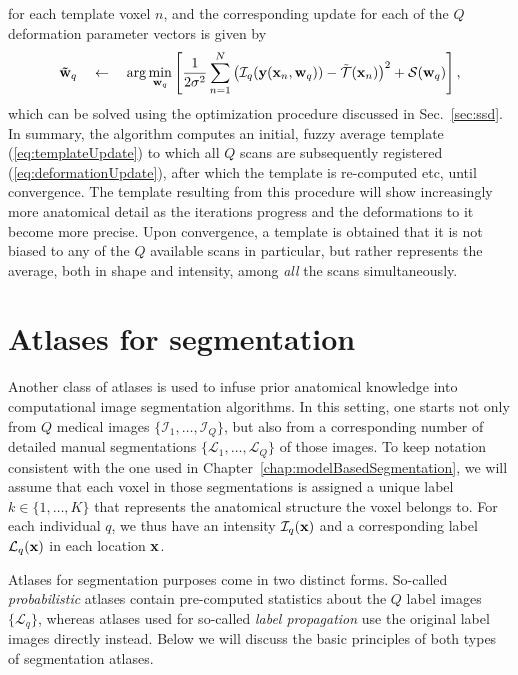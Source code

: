 \documentclass[10pt,twoside]{book}
\begin{document}
for each template voxel $n$, and the corresponding update for each of the $Q$ deformation parameter vectors is given by
\begin{equation}
  \mathbf{\tilde{w}}_q \quad \gets \quad \arg \min_{\mathbf{w}_q } 
    \left[
    \frac{1}{2\sigma^2}\sum_{n=1}^N
    \left(\mathcal{I}_q(\mathbf{y}(\mathbf{x}_n,\mathbf{w}_q))-\mathcal{\tilde{T}}(\mathbf{x}_n)\right)^2 
    + \mathcal{S}(\mathbf{w}_q) 
   \right],
  \label{eq:deformationUpdate}
\end{equation}
which can be solved using the optimization procedure discussed in Sec.~\ref{sec:ssd}.
In summary, the algorithm computes an initial, fuzzy average template (\eqref{eq:templateUpdate}) to which all $Q$ scans are subsequently registered (\eqref{eq:deformationUpdate}), after which the template is re-computed etc, until convergence. The template resulting from this procedure will show increasingly more anatomical detail as the iterations progress and the deformations to it become more precise. Upon convergence, a template is obtained that it is not biased to any of the $Q$ available scans in particular, but rather represents the average, both in shape and intensity, among \emph{all} the scans simultaneously.


\section{Atlases for segmentation}

Another class of atlases is used to infuse prior anatomical knowledge into computational image 
segmentation algorithms. In this setting, one starts not only from $Q$ medical images $\{ \mathcal{I}_1, \ldots, \mathcal{I}_Q \}$,
but also from a corresponding number of detailed manual segmentations $\{ \mathcal{L}_1, \ldots, \mathcal{L}_Q\}$ of those images. To 
keep notation consistent with the one used in Chapter~\ref{chap:modelBasedSegmentation}, we will assume that each voxel in those segmentations is assigned
a unique label $k \in \{1, \ldots, K\}$ that represents the anatomical structure the voxel belongs to. For each individual $q$,
we thus have an intensity $\mathcal{I}_q( \mathbf{x} )$ and a corresponding label $\mathcal{L}_q( \mathbf{x})$ in each location $\mathbf{x}$.

Atlases for segmentation purposes come in two distinct forms. So-called \emph{probabilistic} atlases contain pre-computed statistics about
the $Q$ label images $\{ \mathcal{L}_q \}$, whereas atlases used for so-called \emph{label propagation} use the original label images
directly instead. Below we will discuss the basic principles of both types of segmentation atlases.  
\end{document}

